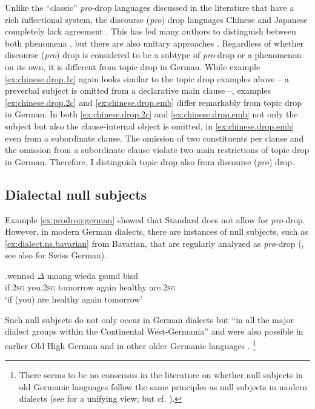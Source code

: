 Unlike the ``classic'' \textit{pro}-drop  languages discussed in the literature that have a rich inflectional system, the discourse (\textit{pro}) drop languages Chinese  and Japanese  completely lack agreement \citep[672]{neeleman.szendroi2007}.
This has led many authors to distinguish between both phenomena \citep[e.g.,][]{huang1984, dalessandro2015}, but there are also unitary approaches \citep[e.g.,][]{sigurdsson2011,duguine2014}.
Regardless of whether discourse (\textit{pro}) drop is considered to be a subtype of \textit{pro}-drop  or a phenomenon on its own, it is different from topic drop in German.
While example \ref{ex:chinese.drop.1c} again looks similar to the topic drop examples above -- a preverbal subject is omitted from a declarative main clause --, examples \ref{ex:chinese.drop.2c} and \ref{ex:chinese.drop.emb} differ remarkably from topic drop in German.
In both \ref{ex:chinese.drop.2c} and \ref{ex:chinese.drop.emb} not only the subject but also the clause-internal object is omitted, in \ref{ex:chinese.drop.emb}  even from a subordinate clause.
The omission of two constituents per clause and the omission from a subordinate clause violate two main restrictions of topic drop in German.  
Therefore, I distinguish topic drop also from discourse (\textit{pro}) drop.

\subsection{Dialectal null subjects}\label{sec:dialectal.null.subjects} 
Example \ref{ex:prodrop:german} showed that Standard  does not allow for \textit{pro}-drop.
However, in modern German dialects, there are instances of null subjects, such as \ref{ex:dialect.ns.bavarian} from Bavarian, that are regularly analyzed as \textit{pro}-drop  (\cite{rosenkvist2009,axel.weiss2011}, see also \cite[159--167]{frick2017} for Swiss German).

\exg.\label{ex:dialect.ns.bavarian}wennsd $\Delta$ moang wieda gsund bisd\\
if.\textsc{2sg} you.\textsc{2sg} tomorrow again healthy are.\textsc{2sg}\\
`if (you) are healthy again tomorrow' \citep[36]{axel.weiss2011}

Such null subjects do not only occur in German dialects but ``in all the major dialect groups within the Continental West-Germania'' \citep[21]{axel.weiss2011} and were also possible in earlier Old High German \citep{axel.weiss2011} and in other older Germanic languages \citep{rosenkvist2009}.%
\footnote{There seems to be no consensus in the literature on whether null subjects in old Germanic languages follow the same principles as null subjects in modern dialects (see \cite{axel.weiss2011} for a unifying view; but cf. \cite{rosenkvist2009}).}
%

